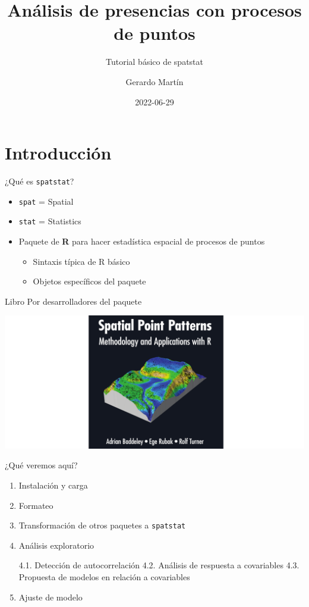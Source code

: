 \documentclass[
  11pt,
  ignorenonframetext,
]{beamer}
\title{Análisis de presencias con procesos de puntos}
\subtitle{Tutorial básico de spatstat}
\author{Gerardo Martín}
\date{2022-06-29}
\providecommand{\tightlist}{%
  \setlength{\itemsep}{0pt}\setlength{\parskip}{0pt}}
\begin{document}
\frame{\titlepage}

\hypertarget{introducciuxf3n}{%
\section{Introducción}\label{introducciuxf3n}}

\begin{frame}[fragile]{¿Qué es \texttt{spatstat}?}
\protect\hypertarget{quuxe9-es-spatstat}{}
\begin{itemize}
\item
  \texttt{spat} = Spatial
\item
  \texttt{stat} = Statistics
\item
  Paquete de \textbf{R} para hacer estadística espacial de procesos de
  puntos

  \begin{itemize}
  \tightlist
  \item
    Sintaxis típica de R básico
  \item
    Objetos específicos del paquete
  \end{itemize}
\end{itemize}
\end{frame}

\begin{frame}{Libro}
\protect\hypertarget{libro}{}
Por desarrolladores del paquete

\includegraphics[width=20.83in]{Figuras/Spat-book}
\end{frame}

\begin{frame}[fragile]{¿Qué veremos aquí?}
\protect\hypertarget{quuxe9-veremos-aquuxed}{}
\begin{enumerate}
\item
  Instalación y carga
\item
  Formateo
\item
  Transformación de otros paquetes a \texttt{spatstat}
\item
  Análisis exploratorio

  4.1. Detección de autocorrelación 4.2. Análisis de respuesta a
  covariables 4.3. Propuesta de modelos en relación a covariables
\item
  Ajuste de modelo
\end{enumerate}
\end{frame}
\end{document}

